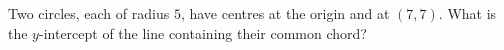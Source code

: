 Two circles, each of radius $5$, have centres at the origin and at $(7,7)$. What is the $y$-intercept of the line containing their common chord?
